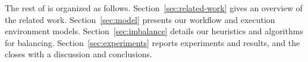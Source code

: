 The rest of  is organized as follows. Section~\ref{sec:related-work} gives an overview of the related work. Section~\ref{sec:model} presents our workflow and execution environment models. Section~\ref{sec:imbalance} details our heuristics and algorithms for balancing. Section~\ref{sec:experiments} reports experiments and results, and the  closes with a discussion and conclusions.

